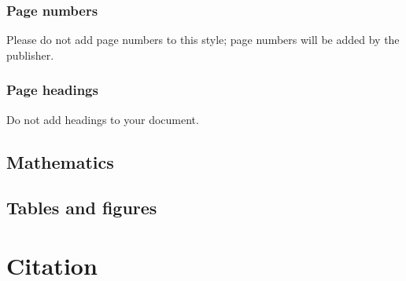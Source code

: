 \documentclass{SeminarV2}
\begin{document}
\subsubsection{Page numbers}
Please do not add page numbers to this style; page numbers will be added by the publisher.

\subsubsection{Page headings}
Do not add headings to your document.

\subsection{Mathematics}


\subsection{Tables and figures}


\section{Citation}
\begin{footnotesize}


\end{footnotesize}
\end{document}
